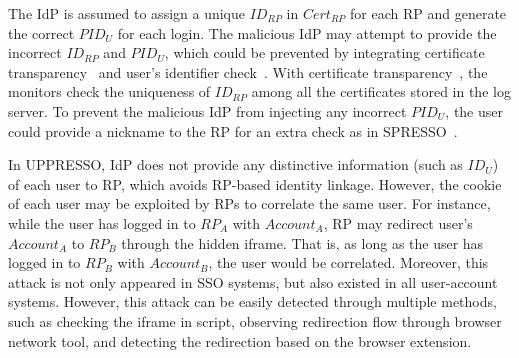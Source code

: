 



 The IdP is assumed to assign a unique $ID_{RP}$ in $Cert_{RP}$ for each RP and generate the correct $PID_U$ for each login. The malicious IdP may attempt to provide the incorrect $ID_{RP}$ and $PID_U$, which could be prevented by integrating certificate transparency~\cite{rfc6962} and user's identifier check~\cite{SPRESSO}. With certificate transparency~\cite{rfc6962}, the monitors  check the uniqueness of $ID_{RP}$ among all the certificates stored in the log server. To prevent the malicious IdP from injecting any incorrect $PID_U$, the user could provide a nickname to the RP for an extra check as in SPRESSO~\cite{SPRESSO}.

In UPPRESSO, IdP does not provide any distinctive information (such as $ID_U$) of each user to RP, which avoids RP-based identity linkage. However, the cookie of each user may be exploited by RPs to correlate the same user. For instance, while the user has logged in to $RP_A$ with $Account_A$, RP may redirect user's $Account_A$ to $RP_B$ through the hidden iframe. That is, as long as the user has logged in to $RP_B$ with $Account_B$, the user would be correlated. Moreover, this attack is not only appeared in SSO systems, but also existed in all user-account systems. However, this attack can be easily detected through multiple methods, such as checking the iframe in script, observing redirection flow through browser network tool, and detecting the redirection based on the browser extension.